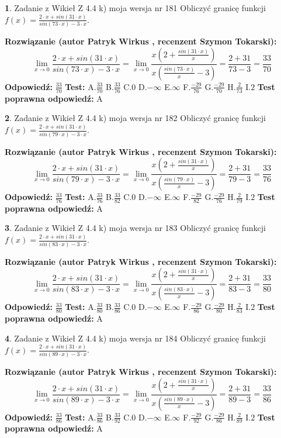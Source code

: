 \documentclass[12pt, a4paper]{article}
\theoremstyle{definition} %
\newtheorem{zad}{}
\newcommand{\zadStart}[1]{\begin{zad}#1\newline}
\newcommand{\zadStop}{\end{zad}}
\newcommand{\rozwStart}[2]{\noindent \textbf{Rozwiązanie (autor #1 , recenzent #2): }\newline}
\newcommand{\rozwStop}{\newline}
\newcommand{\odpStart}{\noindent \textbf{Odpowiedź:}\newline}
\newcommand{\odpStop}{\newline}
\newcommand{\testStart}{\noindent \textbf{Test:}\newline}
\newcommand{\testStop}{\newline}
\newcommand{\kluczStart}{\noindent \textbf{Test poprawna odpowiedź:}\newline}
\newcommand{\kluczStop}{\newline}
\begin{document}
\zadStart{Zadanie z Wikieł Z 4.4 k) moja wersja nr 181}
Obliczyć granicę funkcji $f(x)=\frac{2\cdot x +sin(31\cdot x)}{sin(73\cdot x) -3\cdot x}$.
\zadStop
\rozwStart{Patryk Wirkus}{Szymon Tokarski}
$$\lim\limits_{x\to 0}\frac{2\cdot x +sin(31\cdot x)}{sin(73\cdot x) -3\cdot x}
=\lim\limits_{x\to 0}\frac{x(2+\frac{sin(31\cdot x)}{x})}{x(\frac{sin(73\cdot x)}{x}-3)}
=\frac{2+31}{73-3} = \frac{33}{70}$$
\rozwStop
\odpStart
$\frac{33}{70}$
\odpStop
\testStart
A.$\frac{33}{70}$
B.$\frac{33}{76}$
C.$0$
D.$-\infty$
E.$\infty$
F.$\frac{-29}{76}$
G.$\frac{-29}{70}$
H.$\frac{2}{73}$
I.$2$
\testStop
\kluczStart
A
\kluczStop



\zadStart{Zadanie z Wikieł Z 4.4 k) moja wersja nr 182}
Obliczyć granicę funkcji $f(x)=\frac{2\cdot x +sin(31\cdot x)}{sin(79\cdot x) -3\cdot x}$.
\zadStop
\rozwStart{Patryk Wirkus}{Szymon Tokarski}
$$\lim\limits_{x\to 0}\frac{2\cdot x +sin(31\cdot x)}{sin(79\cdot x) -3\cdot x}
=\lim\limits_{x\to 0}\frac{x(2+\frac{sin(31\cdot x)}{x})}{x(\frac{sin(79\cdot x)}{x}-3)}
=\frac{2+31}{79-3} = \frac{33}{76}$$
\rozwStop
\odpStart
$\frac{33}{76}$
\odpStop
\testStart
A.$\frac{33}{76}$
B.$\frac{33}{82}$
C.$0$
D.$-\infty$
E.$\infty$
F.$\frac{-29}{82}$
G.$\frac{-29}{76}$
H.$\frac{2}{79}$
I.$2$
\testStop
\kluczStart
A
\kluczStop



\zadStart{Zadanie z Wikieł Z 4.4 k) moja wersja nr 183}
Obliczyć granicę funkcji $f(x)=\frac{2\cdot x +sin(31\cdot x)}{sin(83\cdot x) -3\cdot x}$.
\zadStop
\rozwStart{Patryk Wirkus}{Szymon Tokarski}
$$\lim\limits_{x\to 0}\frac{2\cdot x +sin(31\cdot x)}{sin(83\cdot x) -3\cdot x}
=\lim\limits_{x\to 0}\frac{x(2+\frac{sin(31\cdot x)}{x})}{x(\frac{sin(83\cdot x)}{x}-3)}
=\frac{2+31}{83-3} = \frac{33}{80}$$
\rozwStop
\odpStart
$\frac{33}{80}$
\odpStop
\testStart
A.$\frac{33}{80}$
B.$\frac{33}{86}$
C.$0$
D.$-\infty$
E.$\infty$
F.$\frac{-29}{86}$
G.$\frac{-29}{80}$
H.$\frac{2}{83}$
I.$2$
\testStop
\kluczStart
A
\kluczStop



\zadStart{Zadanie z Wikieł Z 4.4 k) moja wersja nr 184}
Obliczyć granicę funkcji $f(x)=\frac{2\cdot x +sin(31\cdot x)}{sin(89\cdot x) -3\cdot x}$.
\zadStop
\rozwStart{Patryk Wirkus}{Szymon Tokarski}
$$\lim\limits_{x\to 0}\frac{2\cdot x +sin(31\cdot x)}{sin(89\cdot x) -3\cdot x}
=\lim\limits_{x\to 0}\frac{x(2+\frac{sin(31\cdot x)}{x})}{x(\frac{sin(89\cdot x)}{x}-3)}
=\frac{2+31}{89-3} = \frac{33}{86}$$
\rozwStop
\odpStart
$\frac{33}{86}$
\odpStop
\testStart
A.$\frac{33}{86}$
B.$\frac{33}{92}$
C.$0$
D.$-\infty$
E.$\infty$
F.$\frac{-29}{92}$
G.$\frac{-29}{86}$
H.$\frac{2}{89}$
I.$2$
\testStop
\kluczStart
A
\kluczStop
\end{document}

